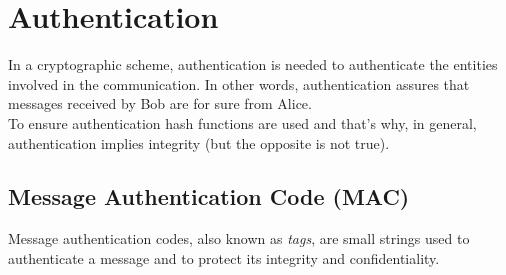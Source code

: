 \section{Authentication}
In a cryptographic scheme, authentication is needed to authenticate the entities involved in the communication. In other words, authentication assures that messages received by Bob are for sure from Alice.\\
To ensure authentication hash functions are used and that's why, in general, authentication implies integrity (but the opposite is not true).

\subsection{Message Authentication Code (MAC)}
Message authentication codes, also known as \emph{tags}, are small strings used to authenticate a message and to protect its integrity and confidentiality.\\
